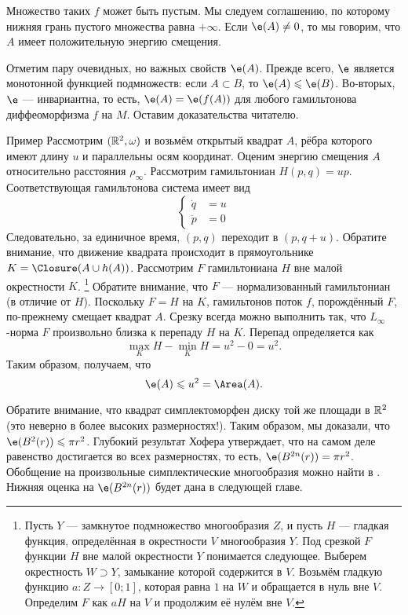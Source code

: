 Множество таких $f$ может быть пустым.
Мы  следуем соглашению, по которому нижняя грань пустого множества равна $+\infty$.
Если $\e (A) \ne 0$, то мы говорим, что $A$ имеет положительную энергию смещения.

Отметим пару очевидных, но важных свойств $\e(A)$.
Прежде всего, $\e$ является монотонной функцией подмножеств: если $A \subset B$, то $\e(A) \le \e(B)$.
Во-вторых, $\e$ --- инвариантна, то есть, $\e (A) = \e (f (A))$ для любого гамильтонова диффеоморфизма $f$ на $M$.
Оставим доказательства читателю.

\begin{ex*}{Пример}
Рассмотрим $(\mathbb{R}^2, \omega)$ и возьмём открытый квадрат $A$, рёбра которого имеют длину $u$ и параллельны осям координат.
Оценим энергию смещения $A$ относительно расстояния $\rho_\infty$.
Рассмотрим гамильтониан $H (p, q) = up$.
Соответствующая гамильтонова система имеет вид 
\[
\begin{cases}
\dot q &= u
\\
\dot p &= 0
\end{cases}
\]
Следовательно, за единичное время, $(p, q)$ переходит в $(p, q + u)$.
Обратите внимание, что движение квадрата происходит в прямоугольнике $K = \Closure (A \cup h (A))$.
Рассмотрим  $F$ гамильтониана $H$ вне малой окрестности $K$.%
\footnote{Пусть $Y$ --- замкнутое подмножество многообразия $Z$, и пусть $H$ --- гладкая функция, определённая в окрестности $V$ многообразия $Y$.
Под срезкой $F$ функции $H$ вне малой окрестности $Y$ понимается следующее.
Выберем окрестность $W\supset Y$, замыкание которой содержится в $V$.
Возьмём гладкую функцию $a\colon Z \to [0; 1]$, которая равна $1$ на $W$ и обращается в нуль вне $V$.
Определим $F$ как $aH$ на $V$ и продолжим её нулём вне $V$.}
Обратите внимание, что $F$ --- нормализованный гамильтониан (в отличие от $H$).
Поскольку $F = H$ на $K$, гамильтонов поток $f$, порождённый $F$, по-прежнему смещает квадрат $A$.
Срезку всегда можно выполнить так, что $L_\infty$-норма $F$ произвольно близка к перепаду $H$ на $K$.
Перепад определяется как 
\[\max_K H - \min_K H = u^2 - 0 = u^2.\]
Таким образом, получаем, что 
\[\e (A) \le u^2 = \Area (A).\]
\end{ex*}

Обратите внимание, что квадрат симплектоморфен диску той же площади в $\mathbb{R}^2$ (это неверно в более высоких размерностях!).
Таким образом, мы доказали, что $\e (B^2 (r)) \le \pi r^2$.
Глубокий результат Хофера \cite{H1} утверждает, что на самом деле равенство
достигается во всех размерностях, то есть, $\e (B^{2n} (r)) = \pi r^2$.
Обобщение на произвольные симплектические многообразия можно найти в \cite{LM1}.
Нижняя оценка на $\e(B^{2n} (r))$ будет дана в следующей главе.

